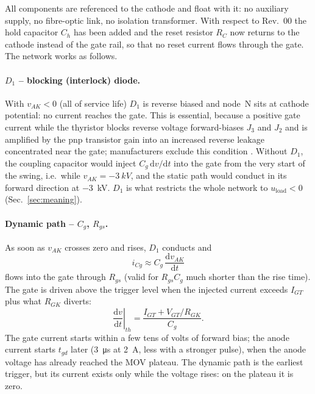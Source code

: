 \documentclass[11pt,a4paper]{article}
\begin{document}
All components are referenced to the cathode and float with it: no auxiliary supply, no
fibre-optic link, no isolation transformer. With respect to Rev.~00 the hold capacitor $C_h$ has
been added and the reset resistor $R_C$ now returns to the cathode instead of the gate rail, so
that no reset current flows through the gate. The network works as follows.

\paragraph{$D_1$ -- blocking (interlock) diode.} With $v_{AK} < 0$ (all of service life) $D_1$
is reverse biased and node~N sits at cathode potential: no current reaches the gate. This is
essential, because a positive gate current while the thyristor blocks reverse voltage
forward-biases $J_3$ and $J_2$ and is amplified by the pnp transistor gain into an increased
reverse leakage concentrated near the gate; manufacturers exclude this condition
\cite{an5sya2034}. Without $D_1$, the coupling capacitor would inject $C_g\,\mathrm{d}v/\mathrm{d}t$
into the gate from the very start of the swing, i.e.\ while $v_{AK} = \SI{-3}{kV}$, and the
static path would conduct in its forward direction at \SI{-3}{kV}. $D_1$ is what restricts the
whole network to $u_{\mathrm{load}} < 0$ (Sec.~\ref{sec:meaning}).

\paragraph{Dynamic path -- $C_g$, $R_{gs}$.} As soon as $v_{AK}$ crosses zero and rises, $D_1$
conducts and
\begin{equation}
  i_{Cg} \approx C_g\,\frac{\mathrm{d}v_{AK}}{\mathrm{d}t}
\end{equation}
flows into the gate through $R_{gs}$ (valid for $R_{gs}C_g$ much shorter than the rise time).
The gate is driven above the trigger level when the injected current exceeds $I_{GT}$ plus what
$R_{GK}$ diverts:
\begin{equation}
  \left.\frac{\mathrm{d}v}{\mathrm{d}t}\right|_{th} = \frac{I_{GT} + V_{GT}/R_{GK}}{C_g}.
  \label{eq:dvth}
\end{equation}
The gate current starts within a few tens of volts of forward bias; the anode current starts
$t_{gd}$ later (\SI{3}{\micro s} at \SI{2}{A}, less with a stronger pulse), when the anode
voltage has already reached the MOV plateau. The dynamic path is the earliest trigger, but its
current exists only while the voltage rises: on the plateau it is zero.
\end{document}
